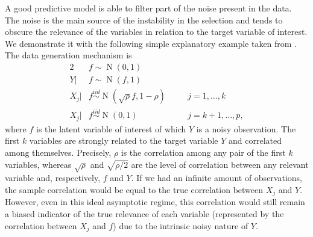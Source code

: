 \documentclass[a4]{article}
\theoremstyle{definition}
\DeclareMathOperator{\N}{N}
\begin{document}
A good predictive model is able to filter part of the noise present in
the data. The noise is the main source of the instability in the selection
and tends to
obscure the relevance of the variables in relation to the target
variable of interest. We demonstrate it with the following simple
explanatory example taken from \cite{paper:projpred}. The data
generation mechanism is
\begin{alignat}{2} \label{eq:simulated_data}
     &f\sim \N(0,1) && \nonumber \\ 
     Y|&f\sim \N(f,1) && \\
     X_{j}|&f \overset{iid}{\sim} \N(\sqrt{\rho}f,1-\rho) \quad &&j=1,\ldots,k \nonumber \\
     X_{j}|&f \overset{iid}{\sim} \N(0,1) &&j=k+1,\ldots,p \nonumber,
\end{alignat}
where $f$ is the latent variable of interest of which $Y$ is a noisy
observation. The first $k$ variables are strongly related to the
target variable $Y$ and correlated among themselves. Precisely, $\rho$
is the correlation among any pair of the first $k$ variables, whereas
$\sqrt{\rho}$ and $\sqrt{\rho/2}$ are the level of correlation between
any relevant variable and, respectively, $f$ and $Y$. If we had an
infinite amount of observations, the sample correlation would be equal
to the true correlation between $X_j$ and $Y$. However, even in this
ideal asymptotic regime, this correlation would still remain a biased
indicator of the true relevance of each variable (represented by the
correlation between $X_j$ and $f$) due to the intrinsic noisy nature
of $Y$.
\end{document}
